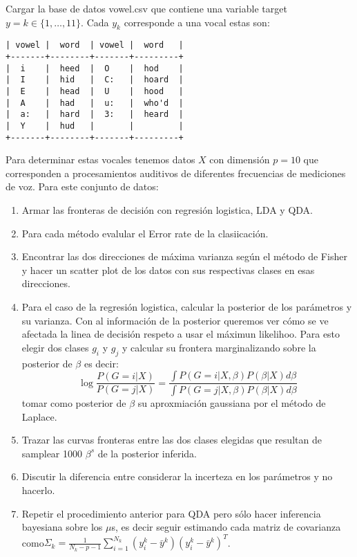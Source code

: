 \documentclass[12pt]{paper}
\begin{document}
Cargar la base de datos vowel.csv que contiene una variable target $y = k \in \{1,\dots,11\}$. Cada $y_{k}$ corresponde a una vocal estas son: 
\begin{verbatim}
| vowel |  word  | vowel |  word   | 
+-------+--------+-------+---------+
|  i    |  heed  |  O    |  hod    |
|  I    |  hid   |  C:   |  hoard  |
|  E    |  head  |  U    |  hood   |
|  A    |  had   |  u:   |  who'd  |
|  a:   |  hard  |  3:   |  heard  |
|  Y    |  hud   |       |         |
+-------+--------+-------+---------+
\end{verbatim}
Para determinar estas vocales tenemos datos $X$ con dimensión $p = 10$ que corresponden a procesamientos auditivos de diferentes frecuencias de mediciones de voz. Para este conjunto de datos:
\begin{enumerate}
\item Armar las fronteras de decisión con regresión logistica, LDA y QDA.
\item Para cada método evalular el Error rate de la clasiicación. 
\item Encontrar las dos direcciones de máxima varianza según el método de Fisher y hacer un scatter plot de los datos con sus respectivas clases en esas direcciones.
\item Para el caso de la regresión logistica, calcular la posterior de los parámetros y su varianza. Con al información de la posterior queremos ver cómo se ve afectada la linea de decisión respeto a usar el máximun likelihoo. Para esto elegir dos clases $g_{i}$ y $g_{j}$ y calcular su frontera marginalizando sobre la posterior de $\beta$ es decir:
\begin{equation}
\log \frac{P(G=i|X)}{P(G=j|X)} = \frac{\int P(G=i|X,\beta) P(\beta|X)d\beta}{\int P(G=j|X,\beta) P(\beta|X)d\beta}
\end{equation}
tomar como posterior de $\beta$ su aproxmiación gaussiana por el método de Laplace.
\item Trazar las curvas fronteras entre las dos clases elegidas que resultan de samplear 1000 $\beta^{s}$ de la posterior inferida. 
\item Discutir la diferencia entre considerar la incerteza en los parámetros y no hacerlo.
\item Repetir el procedimiento anterior para QDA pero sólo hacer inferencia bayesiana sobre los $\mu$s, es decir seguir estimando cada matriz de covarianza como\newline $ \Sigma_{k} = \frac{1}{N_{k}-p-1} \sum_{i=1}^{N_{k}} (y^{k}_{i}-\bar{y}^{k}) (y^{k}_{i}-\bar{y}^{k})^{T}$. 
\end{enumerate}

\pagestyle{empty}
\end{document}
